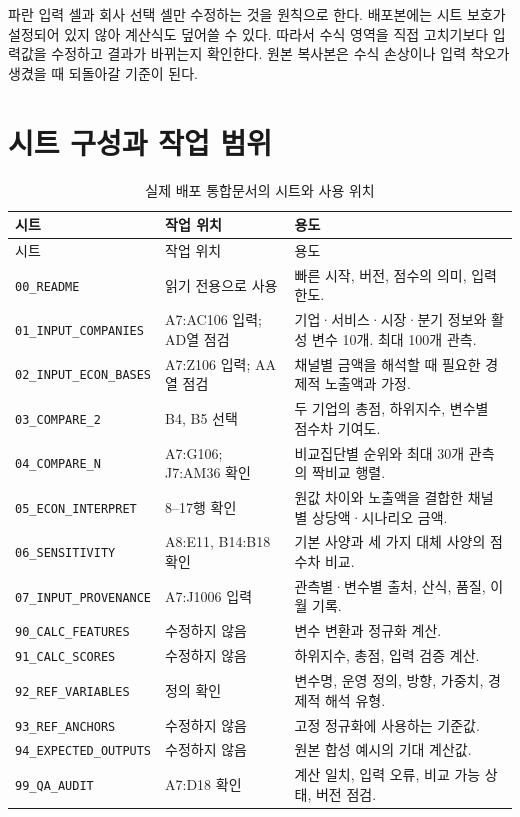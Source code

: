 파란 입력 셀과 회사 선택 셀만 수정하는 것을 원칙으로 한다. 배포본에는 시트 보호가 설정되어 있지 않아 계산식도 덮어쓸 수 있다. 따라서 수식 영역을 직접 고치기보다 입력값을 수정하고 결과가 바뀌는지 확인한다. 원본 복사본은 수식 손상이나 입력 착오가 생겼을 때 되돌아갈 기준이 된다.

\clearpage
\section{시트 구성과 작업 범위}

\begin{longtable}{@{}L{4.0cm}L{3.1cm}L{7.6cm}@{}}
\caption{실제 배포 통합문서의 시트와 사용 위치}\label{tab:simulator-sheet-map}\\
\toprule
{}
시트 & 작업 위치 & 용도 \\
\midrule
\endfirsthead
\toprule
{}
시트 & 작업 위치 & 용도 \\
\midrule
\endhead
\bottomrule
\endfoot
\nolinkurl{00_README} & 읽기 전용으로 사용 & 빠른 시작, 버전, 점수의 의미, 입력 한도. \\
\nolinkurl{01_INPUT_COMPANIES} & A7:AC106 입력; AD열 점검 & 기업·서비스·시장·분기 정보와 활성 변수 10개. 최대 100개 관측. \\
\nolinkurl{02_INPUT_ECON_BASES} & A7:Z106 입력; AA열 점검 & 채널별 금액을 해석할 때 필요한 경제적 노출액과 가정. \\
\nolinkurl{03_COMPARE_2} & B4, B5 선택 & 두 기업의 총점, 하위지수, 변수별 점수차 기여도. \\
\nolinkurl{04_COMPARE_N} & A7:G106; J7:AM36 확인 & 비교집단별 순위와 최대 30개 관측의 짝비교 행렬. \\
\nolinkurl{05_ECON_INTERPRET} & 8--17행 확인 & 원값 차이와 노출액을 결합한 채널별 상당액·시나리오 금액. \\
\nolinkurl{06_SENSITIVITY} & A8:E11, B14:B18 확인 & 기본 사양과 세 가지 대체 사양의 점수차 비교. \\
\nolinkurl{07_INPUT_PROVENANCE} & A7:J1006 입력 & 관측별·변수별 출처, 산식, 품질, 이월 기록. \\
\nolinkurl{90_CALC_FEATURES} & 수정하지 않음 & 변수 변환과 정규화 계산. \\
\nolinkurl{91_CALC_SCORES} & 수정하지 않음 & 하위지수, 총점, 입력 검증 계산. \\
\nolinkurl{92_REF_VARIABLES} & 정의 확인 & 변수명, 운영 정의, 방향, 가중치, 경제적 해석 유형. \\
\nolinkurl{93_REF_ANCHORS} & 수정하지 않음 & 고정 정규화에 사용하는 기준값. \\
\nolinkurl{94_EXPECTED_OUTPUTS} & 수정하지 않음 & 원본 합성 예시의 기대 계산값. \\
\nolinkurl{99_QA_AUDIT} & A7:D18 확인 & 계산 일치, 입력 오류, 비교 가능 상태, 버전 점검. \\
\end{longtable}

